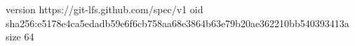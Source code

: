 version https://git-lfs.github.com/spec/v1
oid sha256:e5178e4ca5edadb59e6f6cb758aa68e3864b63e79b20ae362210bb540393413a
size 64
